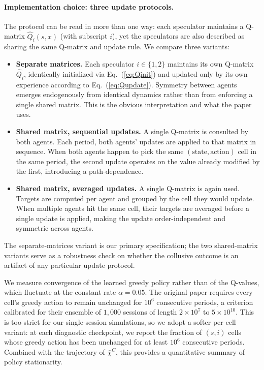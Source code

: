 \documentclass[11pt]{article}
\begin{document}
\paragraph{Implementation choice: three update protocols.}
The protocol can be read in more than one way: each speculator maintains a
Q-matrix $\hat{Q}_i(s,x)$ (with subscript $i$), yet the speculators are also
described as sharing the same Q-matrix and update rule. We compare three variants:
\begin{itemize}
    \item \textbf{Separate matrices.} Each speculator $i \in \{1, 2\}$
    maintains its own Q-matrix $\hat{Q}_i$, identically initialized via
    Eq.~(\ref{eq:Qinit}) and updated only by its own experience according to
    Eq.~(\ref{eq:Qupdate}). Symmetry between agents emerges endogenously
    from identical dynamics rather than from enforcing a single shared matrix.
    This is the obvious interpretation and what the paper uses.
    \item \textbf{Shared matrix, sequential updates.} A single Q-matrix is
    consulted by both agents. Each period, both agents' updates are applied
    to that matrix in sequence. When both agents happen to pick the same
    $(\text{state}, \text{action})$ cell in the same period, the second update
    operates on the value already modified by the first, introducing a
    path-dependence.
    \item \textbf{Shared matrix, averaged updates.} A single Q-matrix is again
    used. Targets are computed per agent and grouped by the cell they would
    update. When multiple agents hit the same cell, their targets are averaged
    before a single update is applied, making the update order-independent and
    symmetric across agents.
\end{itemize}
The separate-matrices variant is our primary specification; the two
shared-matrix variants serve as a robustness check on whether the collusive
outcome is an artifact of any particular update protocol.

We measure convergence of the learned greedy policy rather than of the
Q-values, which fluctuate at the constant rate $\alpha = 0.05$. The original paper requires every cell's greedy action to remain unchanged for $10^6$ consecutive
periods, a criterion calibrated for their ensemble of $1{,}000$ sessions of
length $2 \times 10^7$ to $5 \times 10^{10}$. This is too strict for our
single-session simulations, so we adopt a softer per-cell variant: at each
diagnostic checkpoint, we report the fraction of $(s, i)$ cells whose greedy
action has been unchanged for at least $10^6$ consecutive periods. Combined
with the trajectory of $\bar{\chi}^C$, this provides a quantitative summary
of policy stationarity.
\end{document}

